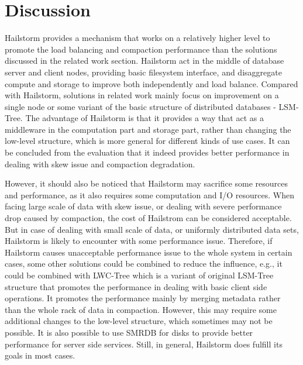 \documentclass[a4paper,10pt,twoside]{article}
\begin{document}
\section{Discussion}
Hailstorm provides a mechanism that works on a relatively higher level to promote the load balancing and compaction performance than the solutions discussed in the related work section.
Hailstorm act in the middle of database server and client nodes, providing basic filesystem interface, and disaggregate compute and storage to improve both independently and load balance.
Compared with Hailstorm, solutions in related work mainly focus on improvement on a single node or some variant of the basic structure of distributed databases - LSM-Tree.
The advantage of Hailstorm is that it provides a way that act as a middleware in the computation part and storage part, rather than changing the low-level structure, 
which is more general for different kinds of use cases.
It can be concluded from the evaluation that it indeed provides better performance in dealing with skew issue and compaction degradation.
\par
However, it should also be noticed that Hailstorm may sacrifice some resources and performance, as it also requires some computation and I/O resources.
When facing large scale of data with skew issue, or dealing with severe performance drop caused by compaction, the cost of Hailstrom can be considered acceptable.
But in case of dealing with small scale of data, or uniformly distributed data sets, Hailstorm is likely to encounter with some performance issue.
Therefore, if Hailstorm causes unacceptable performance issue to the whole system in certain cases, some other solutions could be combined to reduce the influence, 
e.g., it could be combined with LWC-Tree which is a variant of original LSM-Tree structure that promotes the performance in dealing with basic client side operations.
It promotes the performance mainly by merging metadata rather than the whole rack of data in compaction. 
However, this may require some additional changes to the low-level structure, which sometimes may not be possible.
It is also possible to use SMRDB for disks to provide better performance for server side services.
Still, in general, Hailstorm does fulfill its goals in most cases.
\end{document}
